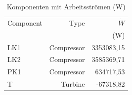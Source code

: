 \begin{longtable}{lrr}
\caption{Komponenten mit Arbeitsströmen (W)} \\
\hline
Component & Type & $\dot W$ \\
 &  & (W) \\
\hline
LK1 & Compressor & 3353083,15 \\
LK2 & Compressor & 3585369,71 \\
PK1 & Compressor & 634717,53 \\
T & Turbine & -67318,82 \\
\hline
\end{longtable}